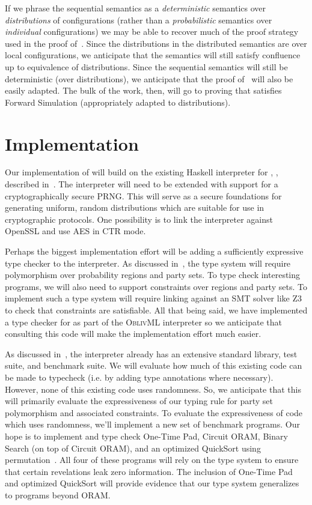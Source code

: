If we phrase the sequential semantics as a \emph{deterministic} semantics over \emph{distributions} of configurations
(rather than a \emph{probabilistic} semantics over \emph{individual} configurations) we may be able to recover much
of the proof strategy used in the proof of~. Since the distributions in the distributed
semantics are over local configurations, we anticipate that the semantics will still satisfy confluence up to equivalence
of distributions. Since the sequential semantics will still be deterministic (over distributions), we anticipate that the
proof of~ will also be easily adapted. The bulk of the work, then, will go to proving that
\lang satisfies Forward Simulation (appropriately adapted to distributions).

\section{Implementation}
\label{sec:proposal-impl}

Our implementation of \lang will build on the existing Haskell interpreter for \mpc, \system, described in~.
The interpreter will need to be extended with support for a cryptographically secure PRNG. This will serve as a secure foundations for
generating uniform, random distributions which are suitable for use in cryptographic protocols. One possibility is to link the interpreter
against OpenSSL and use AES in CTR mode.

Perhaps the biggest implementation effort will be adding a sufficiently expressive type checker to the interpreter. As discussed
in~, the type system will require polymorphism over probability regions and party sets. To
type check interesting programs, we will also need to support constraints over regions and party sets. To implement such a type system
will require linking against an SMT solver like Z3~\cite{10.5555/1792734.1792766} to check that constraints are satisfiable. All that being said, we have
implemented a type checker for \obliv as part of the \textsc{OblivML} interpreter so we anticipate that consulting this code
will make the implementation effort much easier.

As discussed in~, the \system interpreter already has an extensive standard library, test suite, and benchmark
suite. We will evaluate how much of this existing \system code can be made to typecheck (i.e. by adding type annotations where necessary).
However, none of this existing code uses randomness. So, we anticipate that this will primarily evaluate the expressiveness of our
typing rule for party set polymorphism and associated constraints. To evaluate the expressiveness of code which uses randomness,
we'll implement a new set of benchmark programs. Our hope is to implement and type check One-Time Pad, Circuit ORAM,
Binary Search (on top of Circuit ORAM), and an optimized QuickSort using permutation~\cite{obliv-quicksort}. All four of these programs
will rely on the type system to ensure that certain revelations leak zero information. The inclusion of One-Time
Pad and optimized QuickSort will provide evidence that our type system generalizes to programs beyond ORAM.

